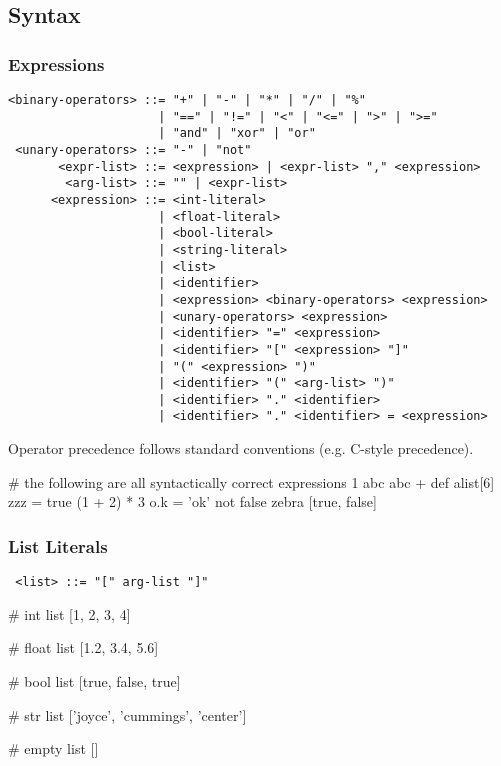 \subsection{Syntax}

\subsubsection{Expressions}
\begin{verbatim}
<binary-operators> ::= "+" | "-" | "*" | "/" | "%"
                     | "==" | "!=" | "<" | "<=" | ">" | ">="
                     | "and" | "xor" | "or"
 <unary-operators> ::= "-" | "not"
       <expr-list> ::= <expression> | <expr-list> "," <expression>
        <arg-list> ::= "" | <expr-list>
      <expression> ::= <int-literal>
                     | <float-literal>
                     | <bool-literal>
                     | <string-literal>
                     | <list>
                     | <identifier>
                     | <expression> <binary-operators> <expression>
                     | <unary-operators> <expression>
                     | <identifier> "=" <expression>
                     | <identifier> "[" <expression> "]"
                     | "(" <expression> ")"
                     | <identifier> "(" <arg-list> ")"
                     | <identifier> "." <identifier>
                     | <identifier> "." <identifier> = <expression>
\end{verbatim}

\noindent
Operator precedence follows standard conventions (e.g. C-style precedence).

\begin{mylisting}
# the following are all syntactically correct expressions
1
abc
abc + def
alist[6]
zzz = true
(1 + 2) * 3
o.k = 'ok'
not false
zebra %
[true, false]
\end{mylisting}

\subsubsection{List Literals}
\begin{verbatim}
 <list> ::= "[" arg-list "]"
\end{verbatim}

\begin{mylisting}
# int list
[1, 2, 3, 4]

# float list
[1.2, 3.4, 5.6]

# bool list
[true, false, true]

# str list
['joyce', 'cummings', 'center']

# empty list
[]
\end{mylisting}

